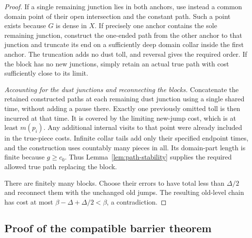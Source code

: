 \begin{proof}
If a single remaining junction lies in both anchors, use instead a
common domain point of their open intersection and the constant path.
Such a point exists because $G$ is dense in $X$.  If precisely one
anchor contains the sole remaining junction, construct the one-ended
path from the other anchor to that junction and truncate its end on
a sufficiently deep domain collar inside the first anchor.  The
truncation adds no dust toll, and reversal gives the required order.
If the block has no new junctions, simply retain an actual true path
with cost sufficiently close to its limit.

\emph{Accounting for the dust junctions and reconnecting the blocks.}
Concatenate the retained constructed paths at each remaining dust
junction using a single shared time, without adding a pause there.
Exactly one previously omitted toll is then incurred at that time.
It is covered by the limiting new-jump cost, which is at least
$m(p_i)$.  Any additional internal visits to that point were already
included in the true-piece costs.  Infinite collar tails add only
their specified endpoint times, and the construction uses countably
many pieces in all.  Its domain-part length is finite because
$g\ge c_0$.  Thus Lemma~\ref{lem:path-stability} supplies the
required allowed true path replacing the block.

There are finitely many blocks.  Choose their errors to have total
less than $\Delta/2$ and reconnect them with the unchanged old jumps.
The resulting old-level chain has cost at most
$\beta-\Delta+\Delta/2<\beta$, a contradiction.
\end{proof}

\subsection{Proof of the compatible barrier theorem}

